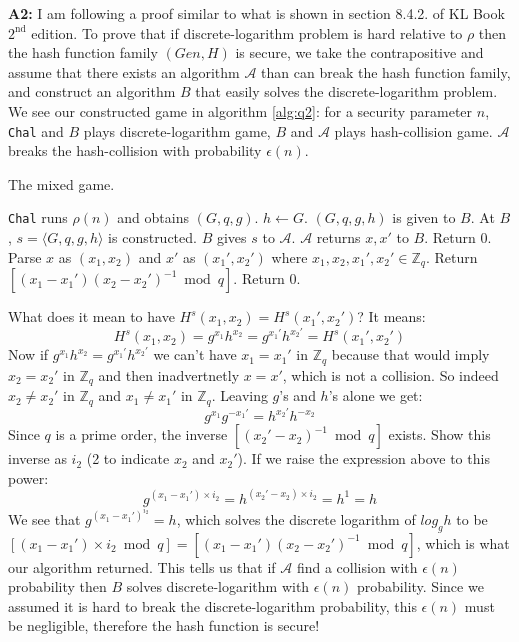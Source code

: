\documentclass[12pt,reqno]{amsart}
\newcommand{\code}[1]{\texttt{#1}}
\newcommand{\advrs}[0]{\mathcal{A}}
\begin{document}
\textbf{A2:} I am following a proof similar to what is shown in section 8.4.2. of KL Book $2^\textrm{nd}$ edition. To prove that if discrete-logarithm problem is hard relative to $\rho$ then the hash function family $(Gen, H)$ is secure, we take the contrapositive and assume that there exists an algorithm $\advrs$ than can break the hash function family, and construct an algorithm $B$ that easily solves the discrete-logarithm problem. We see our constructed game in algorithm \ref{alg:q2}: for a security parameter $n$, \code{Chal} and $B$ plays discrete-logarithm game, $B$ and $\advrs$ plays hash-collision game. $\advrs$ breaks the hash-collision with probability $\epsilon(n)$.
\begin{algorithm}
\caption{The mixed game.}
\label{alg:q2}
\begin{algorithmic}
\STATE \code{Chal} runs $\rho(n)$ and obtains $(G,q,g)$.
\STATE $h \gets G$.
\STATE $(G,q,g,h)$ is given to $B$.
\STATE At $B$, $s = \langle G,q,g,h \rangle$ is constructed.
\STATE $B$ gives $s$ to $\advrs$.
\STATE $\advrs$ returns $x, x'$ to $B$.
		\STATE Return 0.
	\ELSE
		\STATE Parse $x$ as $(x_1, x_2)$ and $x'$ as $(x_1', x_2')$ where $x_1, x_2, x_1', x_2' \in \mathbb{Z}_q$.
		\STATE Return $[(x_1 - x_1')(x_2 - x_2')^{-1} \bmod q]$.
	\ENDIF
\ELSE
	\STATE Return 0.
\ENDIF
\end{algorithmic}
\end{algorithm}

What does it mean to have $H^s(x_1, x_2) = H^s(x_1', x_2')$? It means:
$$
H^s(x_1, x_2) = g^{x_1}h^{x_2} = g^{x_1'}h^{x_2'} = H^s(x_1', x_2')
$$
Now if $g^{x_1}h^{x_2} = g^{x_1'}h^{x_2'}$ we can't have $x_1 = x_1'$  in $\mathbb{Z}_q$ because that would imply $x_2 = x_2'$  in $\mathbb{Z}_q$ and then inadvertnetly $x = x'$, which is not a collision. So indeed $x_2 \ne x_2'$ in $\mathbb{Z}_q$ and $x_1 \ne x_1'$  in $\mathbb{Z}_q$. Leaving $g$'s and $h$'s alone we get:
$$
g^{x_1}g^{-x_1'} = h^{x_2'}h^{-x_2}
$$
Since $q$ is a prime order, the inverse $[(x_2' - x_2)^{-1} \bmod q]$ exists. Show this inverse as $i_2$ (2 to indicate $x_2$ and $x_2'$).  If we raise the expression above to this power:
$$
g^{(x_1-x_1')\times i_2} = h^{(x_2'-x_2)\times i_2} = h^1 = h
$$
We see that $g^{(x_1-x_1')^{i_2}} = h$, which solves the discrete logarithm of $log_gh$ to be $[(x_1-x_1')\times i_2 \bmod q] = [(x_1 - x_1')(x_2 - x_2')^{-1} \bmod q]$, which is what our algorithm returned. This tells us that if $\advrs$ find a collision with $\epsilon(n)$ probability then $B$ solves discrete-logarithm with $\epsilon(n)$ probability. Since we assumed it is hard to break the discrete-logarithm probability, this $\epsilon(n)$ must be negligible, therefore the hash function is secure!
\end{document}
